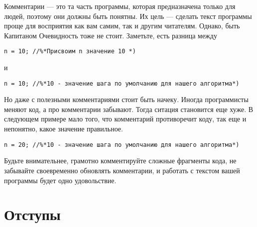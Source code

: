 \documentclass{article}
\begin{document}
Комментарии --- это та часть программы, которая предназначена только для людей, поэтому они должны быть понятны. Их цель --- сделать текст программы проще для восприятия как вам самим, так и другим читателям. Однако, быть Капитаном Очевидность тоже не стоит. Заметьте, есть разница между

%

\begin{lstlisting}[caption={Абсолютно бессмысленный комментарий}, captionpos=b, style=cpp]
	n = 10; //%*Присвоим n значение 10 *)
\end{lstlisting}

и

\begin{lstlisting}[caption={Feel the difference}, captionpos=b, style=cpp]
	n = 10; //%*10 - значение шага по умолчанию для нашего алгоритма*)
\end{lstlisting}

Но даже с полезными комментариями стоит быть начеку. Иногда программисты меняют код, а про комментарии забывают. Тогда ситация становится еще хуже. В следующем примере мало того, что комментарий противоречит коду, так еще и непонятно, какое значение правильное.

\begin{lstlisting}[caption={Oops}, captionpos=b, style=cpp]
	n = 20; //%*10 - значение шага по умолчанию для нашего алгоритма*)
\end{lstlisting}

Будьте внимательнее, грамотно комментируйте сложные фрагменты кода, не забывайте своевременно обновлять комментарии, и работать с текстом вашей программы будет одно удовольствие.

\section*{Отступы}
\end{document}
